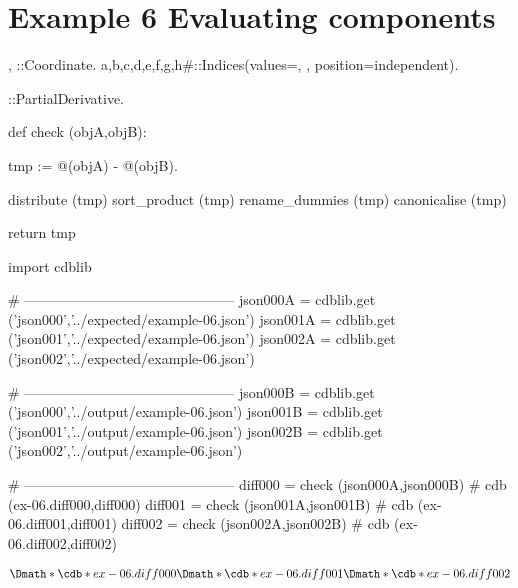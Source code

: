 \documentclass[12pt]{cdblatex}
\begin{document}
\section*{Example 6 Evaluating components}

\begin{cadabra}
   {\theta, \varphi}::Coordinate.
   {a,b,c,d,e,f,g,h#}::Indices(values={\theta, \varphi}, position=independent).

   \partial{#}::PartialDerivative.

   def check (objA,objB):

       tmp := @(objA) - @(objB).

       distribute     (tmp)
       sort_product   (tmp)
       rename_dummies (tmp)
       canonicalise   (tmp)

       return tmp

   import cdblib

   # ---------------------------------------------
   json000A = cdblib.get ('json000','../expected/example-06.json')
   json001A = cdblib.get ('json001','../expected/example-06.json')
   json002A = cdblib.get ('json002','../expected/example-06.json')

   # ---------------------------------------------
   json000B = cdblib.get ('json000','../output/example-06.json')
   json001B = cdblib.get ('json001','../output/example-06.json')
   json002B = cdblib.get ('json002','../output/example-06.json')

   # ---------------------------------------------
   diff000 = check (json000A,json000B)   # cdb (ex-06.diff000,diff000)
   diff001 = check (json001A,json001B)   # cdb (ex-06.diff001,diff001)
   diff002 = check (json002A,json002B)   # cdb (ex-06.diff002,diff002)

\end{cadabra}

\clearpage

\begin{dgroup*}
   \Dmath*{\cdb*{ex-06.diff000}}
   \Dmath*{\cdb*{ex-06.diff001}}
   \Dmath*{\cdb*{ex-06.diff002}}
\end{dgroup*}
\end{document}
